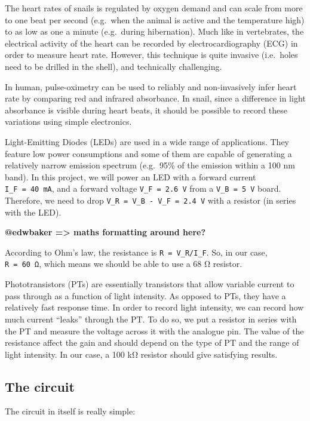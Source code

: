 \documentclass[]{article}
\begin{document}
The heart rates of snails is regulated by oxygen demand and can scale
from more to one beat per second (e.g.~when the animal is active and the
temperature high) to as low as one a minute (e.g.~during hibernation).
Much like in vertebrates, the electrical activity of the heart can be
recorded by electrocardiography (ECG) in order to measure heart rate.
However, this technique is quite invasive (i.e.~holes need to be drilled
in the shell), and technically challenging.

In human, pulse-oximetry can be used to reliably and non-invasively
infer heart rate by comparing red and infrared absorbance. In snail,
since a difference in light absorbance is visible during heart beats, it
should be possible to record these variations using simple electronics.

Light-Emitting Diodes (LEDs) are used in a wide range of applications.
They feature low power consumptions and some of them are capable of
generating a relatively narrow emission spectrum (e.g.~95\% of the
emission within a 100 nm band). In this project, we will power an LED
with a forward current \texttt{I\_F\ =\ 40\ mA}, and a forward voltage
\texttt{V\_F\ =\ 2.6\ V} from a \texttt{V\_B\ =\ 5\ V} board. Therefore,
we need to drop \texttt{V\_R\ =\ V\_B\ -\ V\_F\ =\ 2.4\ V} with a
resistor (in series with the LED).

\textbf{@edwbaker =\textgreater{} maths formatting around here?}

According to Ohm's law, the resistance is \texttt{R\ =\ V\_R/I\_F}. So,
in our case, \texttt{R\ =\ 60\ Ω}, which means we should be able to use
a 68 Ω resistor.

Phototransistors (PTs) are essentially transistors that allow variable
current to pass through as a function of light intensity. As opposed to
PTs, they have a relatively fast response time. In order to record light
intensity, we can record how much current ``leaks'' through the PT. To
do so, we put a resistor in series with the PT and measure the voltage
across it with the analogue pin. The value of the resistance affect the
gain and should depend on the type of PT and the range of light
intensity. In our case, a 100 kΩ resistor should give satisfying
results.

\subsection{The circuit}\label{the-circuit}

The circuit in itself is really simple:
\end{document}

